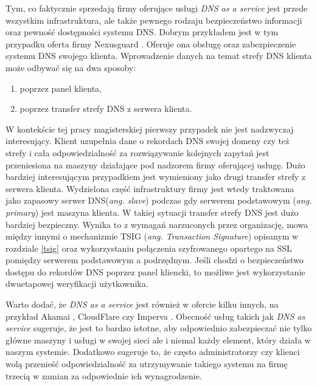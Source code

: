 Tym, co faktycznie sprzedają firmy oferujące usługi \textit{DNS as a service} jest przede wszystkim infrastruktura, ale także
pewnego rodzaju bezpieczeństwo informacji oraz pewność dostępności systemu DNS. Dobrym przykładem jest w tym przypadku oferta firmy
Nexusguard \cite{nexusguard}. Oferuje ona obsługę oraz zabezpieczenie systemu DNS swojego klienta. Wprowadzenie danych na temat strefy
DNS klienta może odbywać się na dwa sposoby:
\begin{enumerate}
	\item poprzez panel klienta,
	\item poprzez transfer strefy DNS z serwera klienta.
\end{enumerate}
W kontekście tej pracy magisterskiej pierwszy przypadek nie jest nadzwyczaj interesujący. Klient uzupełnia dane o rekordach DNS
swojej domeny czy też strefy i cała odpowiedzialność za rozwiązywanie kolejnych zapytań jest przeniesiona na maszyny działające
pod nadzorem firmy oferującej usługę. Dużo bardziej interesującym przypadkiem jest wymieniony jako drugi transfer strefy z serwera
klienta. Wydzielona część infrastruktury firmy jest wtedy traktowana jako zapasowy serwer DNS(\textit{ang. slave}) podczas gdy
serwerem podstawowym (\textit{ang. primary}) jest maszyna klienta. W takiej sytuacji transfer strefy DNS jest dużo bardziej bezpieczny. Wynika to
z wymagań narzuconych przez organizację, mowa między innymi o mechanizmie TSIG (\textit{ang. Transaction Signature})  opisanym w
rozdziale \ref{tsig} oraz wykorzystaniu połączenia szyfrowanego opartego na SSL pomiędzy serwerem podstawowym a podrzędnym. Jeśli
chodzi o bezpieczeństwo dostępu do rekordów DNS poprzez panel kliencki, to możliwe jest wykorzystanie dwuetapowej weryfikacji użytkownika.

Warto dodać, że \textit{DNS as a service} jest również w ofercie kilku innych, na przykład Akamai \cite{akamai},
CloudFlare \cite{cloudflare} czy Imperva \cite{incapsula}. Obecność usług takich jak \textit{DNS as service} sugeruje, że jest to bardzo
istotne, aby odpowiednio zabezpieczać nie tylko główne maszyny i usługi w swojej sieci ale i niemal każdy element, który działa
w naszym systemie. Dodatkowo sugeruje to, że często administratorzy czy klienci wolą przenieść odpowiedzialność za utrzymywanie
takiego systemu na firmę trzecią w zamian za odpowiednie ich wynagrodzenie.

